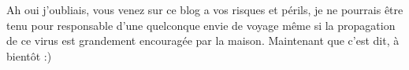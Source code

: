 \begin{multicols}{2}
Ah oui j'oubliais, vous venez sur ce blog a vos risques et périls, je ne pourrais être tenu pour responsable d'une quelconque envie de voyage même si la propagation de ce virus est grandement encouragée par la maison. Maintenant que c'est dit, à bientôt :)

\end{multicols}


